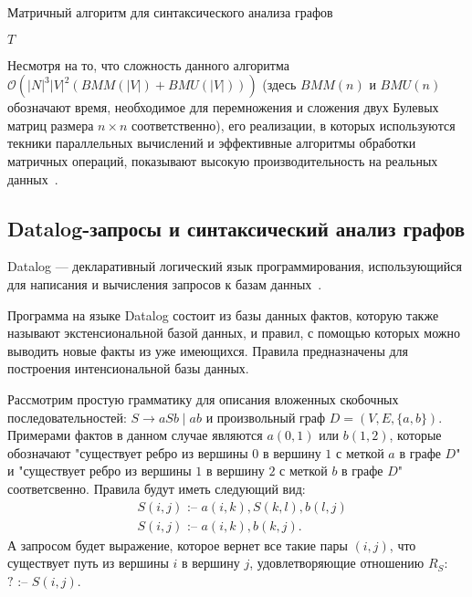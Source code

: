 \documentclass[12pt]{matmex-diploma-custom}
\begin{document}
\begin{algorithm}[H]
\begin{algorithmic}[1]
\caption{Матричный алгоритм для синтаксического анализа графов}
\label{alg:graphParse}

\EndFor    
{}
   
\EndWhile
\State \Return $T$
\end{algorithmic}
\end{algorithm}

Несмотря на то, что сложность данного алгоритма $\mathcal{O}(|N|^3|V|^2(BMM(|V|) + BMU(|V|)))$ (здесь $BMM(n)$ и $BMU(n)$ обозначают время, необходимое для перемножения и сложения двух Булевых матриц размера $n \times n$ соответственно), его реализации, в которых используются текники параллельных вычислений и эффективные алгоритмы обработки матричных операций, показывают высокую производительность на реальных данных~\cite{mishin2019evaluation}.

\subsection{Datalog-запросы и синтаксический анализ графов}

Datalog --- декларативный логический язык программирования, использующийся для написания и вычисления запросов к базам данных~\cite{ceri1989you}. 

Программа на языке Datalog состоит из базы данных фактов, которую также называют экстенсиональной базой данных, и правил, с помощью которых можно выводить новые факты из уже имеющихся. Правила предназначены для построения интенсиональной базы данных.

Рассмотрим простую грамматику для описания вложенных скобочных последовательностей: $S \to aSb \mid ab$ и произвольный граф $D =(V, E, \{a, b\})$.
Примерами фактов в данном случае являются $a(0, 1)$ или $b(1, 2)$, которые обозначают "существует ребро из вершины $0$ в вершину $1$ с меткой $a$ в графе $D$" и "существует ребро из вершины $1$ в вершину $2$ с меткой $b$ в графе $D$" соответсвенно.
Правила будут иметь следующий вид:
\begin{align*}
& S(i, j) \text{ :-- } a(i, k), S(k, l), b(l, j) \\
& S(i, j) \text{ :-- } a(i, k), b(k, j).
\end{align*}
А запросом будет выражение, которое вернет все такие пары $(i, j)$, что существует путь из вершины $i$ в вершину $j$, удовлетворяющие отношению $R_S$: $? \text{ :-- } S(i, j)$.
\end{document}
